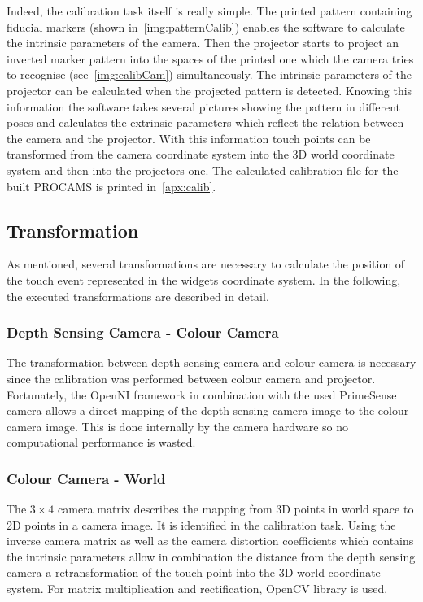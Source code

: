Indeed, the calibration task itself is really simple. The printed pattern containing fiducial markers (shown in~\autoref{img:patternCalib}) enables the software to calculate the intrinsic parameters of the camera. Then the projector starts to project an inverted  marker pattern into the spaces of the printed one which the camera tries to recognise (see~\autoref{img:calibCam}) simultaneously. The intrinsic parameters of the projector can be calculated when the projected pattern is detected. Knowing this information the software takes several pictures showing the pattern in different poses and calculates the extrinsic parameters which reflect the relation between the camera and the projector. With this information touch points can be transformed from the camera coordinate system into the 3D world coordinate system and then into the projectors one. The calculated calibration file for the built PROCAMS is printed in~\autoref{apx:calib}.

\subsection{Transformation}
As mentioned, several transformations are necessary to calculate the position of the touch event represented in the widgets coordinate system. In the following, the executed transformations are described in detail. 

\subsubsection{Depth Sensing Camera - Colour Camera}
The transformation between depth sensing camera and colour camera is necessary since the calibration was performed between colour camera and projector. Fortunately, the OpenNI framework in combination with the used PrimeSense camera allows a direct mapping of the depth sensing camera image to the colour camera image. This is done internally by the camera hardware so no computational performance is wasted. 

\subsubsection{Colour Camera - World}
The $3\times4$ camera matrix describes the mapping from 3D points in world space to 2D points in a camera image. It is identified in the calibration task. Using the inverse camera matrix as well as the camera distortion coefficients which contains the intrinsic parameters allow in combination the distance from the depth sensing camera a retransformation of the touch point into the 3D world coordinate system. For matrix multiplication and rectification, OpenCV library is used. 

